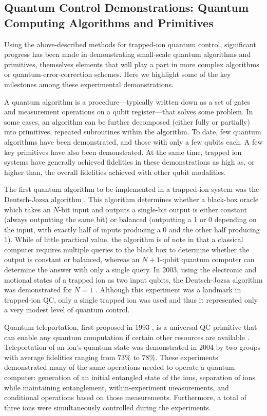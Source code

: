 \documentclass[%
12pt,
 amsmath,amssymb,
]{revtex4-2}
\begin{document}
\subsection{Quantum Control Demonstrations:  Quantum Computing Algorithms and Primitives}
\label{Algorithms}

Using the above-described methods for trapped-ion quantum control, significant progress has been made in demonstrating small-scale quantum algorithms and primitives, themselves elements that will play a part in more complex algorithms or quantum-error-correction schemes.  Here we highlight some of the key milestones among these experimental demonstrations.

A quantum algorithm is a procedure---typically written down as a set of gates and measurement operations on a qubit register---that solves some problem. In some cases, an algorithm can be further decomposed (either fully or partially) into primitives, repeated subroutines within the algorithm. To date, few quantum algorithms have been demonstrated, and those with only a few qubits each. A few key primitives have also been demonstrated. At the same time, trapped ion systems have generally achieved fidelities in these demonstrations as high as, or higher than, the overall fidelities achieved with other qubit modalities.

The first quantum algorithm to be implemented in a trapped-ion system was the Deutsch-Jozsa algorithm \cite{DeutschJozsaAlgorithm}. This algorithm determines whether a black-box oracle which takes an $N$-bit input and outputs a single-bit output is either constant (always outputting the same bit) or balanced (outputting a 1 or 0 depending on the input, with exactly half of inputs producing a 0 and the other half producing 1). While of little practical value, the algorithm is of note in that a classical computer requires multiple queries to the black box to determine whether the output is constant or balanced, whereas an $N+1$-qubit quantum computer can determine the answer with only a single query. In 2003, using the electronic and motional states of a trapped ion as two input qubits, the Deutsch-Jozsa algorithm was demonstrated for $N=1$ \cite{GuldeDeutschJozsa2003}. Although this experiment was a landmark in trapped-ion QC, only a single trapped ion was used and thus it represented only a very modest level of quantum control.

Quantum teleportation, first proposed in 1993 \cite{BennettTeleportation1993}, is a universal QC primitive that can enable any quantum computation if certain other resources are available \cite{GottesmanChuang1999}. Teleportation of an ion's quantum state was demonstrated in 2004 by two groups \cite{BarrettTeleportation2004, RiebeTeleportation2004} with average fidelities ranging from $73 \%$ to $78 \%$. These experiments demonstrated many of the same operations needed to operate a quantum computer: generation of an initial entangled state of the ions, separation of ions while maintaining entanglement, within-experiment measurements, and conditional operations based on those measurements. Furthermore, a total of three ions were simultaneously controlled during the experiments.
\end{document}
